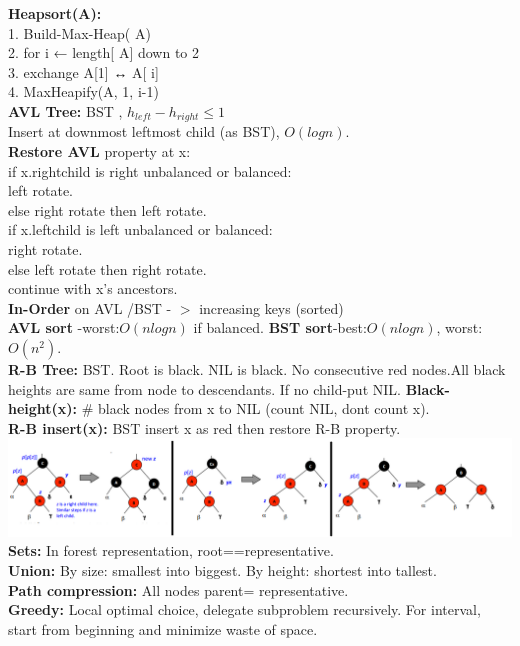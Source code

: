 \documentclass[paper=a4, fontsize=11pt]{scrartcl} %
\begin{document}
\textbf{Heapsort(A):}\\
1. Build-Max-Heap( A)\\
2. for i ← length[ A] down to 2\\
3. \indent exchange A[1] ↔ A[ i]\\
4. \indent MaxHeapify(A, 1, i-1)\\
\textbf{AVL Tree: }BST , $h_{left} - h_{right} \leq 1$\\
Insert at downmost leftmost child (as BST), $O(log n)$.\\
\textbf{Restore AVL }property at x: \\
if x.rightchild is right unbalanced or balanced: \\
\indent left rotate. \\
\indent else right rotate then left rotate.\\
if x.leftchild is left unbalanced or balanced: \\
\indent right rotate. \\
\indent else left rotate then right rotate.\\
continue with x's ancestors.\\
\textbf{In-Order} on AVL /BST - $>$ increasing keys (sorted)\\
\textbf{AVL sort} -worst:$O(nlogn)$ if balanced. \textbf{BST sort}-best:$O(nlogn)$, worst:$O(n^2)$.\\
\textbf{R-B Tree:} BST. Root is black. NIL is black. No consecutive red nodes.All black heights are same from node to descendants. If no child-put NIL. \textbf{Black-height(x):} \# black nodes from x to NIL (count NIL, dont count x).\\
\textbf{R-B insert(x): } BST insert x as red then restore R-B property.\\
\includegraphics[scale=0.6]{RB-fix.png}\\
\textbf{Sets: }In forest representation, root==representative.\\
\textbf{Union: }By size: smallest into biggest. By height: shortest into tallest.\\
\textbf{Path compression: }All nodes parent= representative.\\
\textbf{Greedy: } Local optimal choice, delegate subproblem recursively. For interval, start from beginning and minimize waste of space.\\
\end{document}
